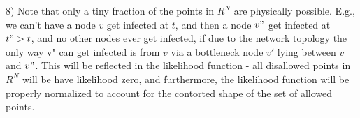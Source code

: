 \documentclass{article}
\begin{document}

	






	



	8) Note that only a tiny fraction of the points in $R^{N}$ are physically
	possible. E.g., we can't have a node $v$ get infected at $t$, and then a
	node $v"$ get infected at $t" > t$, and no other nodes ever get infected,
	if due to the network topology the only way v" can get infected is
	from $v$ via a bottleneck node $v'$ lying between $v$ and $v"$. This will be
	reflected in the likelihood function - all disallowed points in $R^{N}$
	will be have likelihood zero, and furthermore, the likelihood function
	will be properly normalized to account for the contorted shape of the
	set of allowed points.
\end{document}
